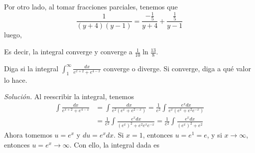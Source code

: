 Por otro lado, al tomar fracciones parciales, tenemos que
\[
\frac{1}{\left( y+4\right) \left( y-1\right) }=\frac{-\frac{1}{5}}{y+4}+%
\frac{\frac{1}{5}}{y-1}
\]
luego,




Es decir, la integral converge y converge a $\frac{1}{10}\ln \frac{13}{8}.$

\begin{ejemplo}
\textnormal{Diga si la integral {\small\textit{$\displaystyle\int_{1}^{\infty }\frac{dx}{e^{x+2}+e^{4-x}} $}} converge o diverge. Si converge, diga a qué valor lo hace.}
\end{ejemplo}
\textit{Solución.} Al reescribir la integral, tenemos
\begin{align*}
\int \frac{dx}{e^{x+2}+e^{4-x}}&=\int \frac{dx}{e^{2}\left(
e^{x}+e^{2-x}\right) }=\frac{1}{e^{2}}\int \frac{e^{x}dx}{e^{x}\left( e^{x}+e^{2}e^{-x}\right) }
\\
&=\frac{1}{e^{2}}\int \frac{e^{x}dx}{\left( e^{x}\right) ^{2}+e^{2}e^{x}e^{-x}}=\frac{1}{e^{2}}\int \frac{e^{x}dx}{\left( e^{x}\right) ^{2}+e^{2}}
\end{align*}
Ahora tomemos $u=e^{x}$ y $du=e^{x}dx$. Si $x=1$, entonces $u=e^{1}=e$, y si $x\to \infty$, entonces $u=e^{x}\rightarrow \infty$. Con ello, la integral dada es




